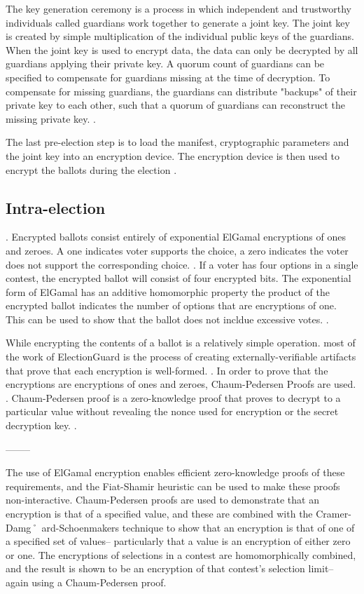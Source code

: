 The key generation ceremony is a process in which independent and trustworthy individuals called guardians work together to generate a joint key. The joint key is created by simple multiplication of the individual public keys of the guardians. When the joint key is used to encrypt data, the data can only be decrypted by all guardians applying their private key. A quorum count of guardians can be specified to compensate for guardians missing at the time of decryption. To compensate for missing guardians, the guardians can distribute "backups" of their private key to each other, such that a quorum of guardians can reconstruct the missing private key. \cite[8]{eg-paper} \cite{eg-docs}.

The last pre-election step is to load the manifest, cryptographic parameters and the joint key into an encryption device. The encryption device is then used to encrypt the ballots during the election \cite[8]{eg-paper}.

\subsection{Intra-election}.
Encrypted ballots consist entirely of exponential ElGamal encryptions of ones and zeroes. A one indicates voter supports the choice, a zero indicates the voter does not support the corresponding choice. \cite[11]{eg-paper} \cite[12]{eg-spec}. If a voter has four options in a single contest, the encrypted ballot will consist of four encrypted bits. The exponential form of ElGamal has an additive homomorphic property the product of the encrypted ballot indicates the number of options that are encryptions of one. This can be used to show that the ballot does not incldue excessive votes. \cite[5]{eg-spec}.

While encrypting the contents of a ballot is a relatively simple operation. most of the work of ElectionGuard is the process of creating externally-verifiable artifacts that prove that each encryption is well-formed. \cite[3]{eg-spec}. In order to prove that the encryptions are encryptions of ones and zeroes, Chaum-Pedersen Proofs are used. \cite[11]{eg-paper}. Chaum-Pedersen proof is a zero-knowledge proof that proves to decrypt to a particular value without revealing the nonce used for encryption or the secret decryption key. \cite[6]{eg-spec}.

--------

The use of ElGamal encryption enables efficient zero-knowledge proofs of these requirements, and
 the Fiat-Shamir heuristic can be used to make these proofs non-interactive. Chaum-Pedersen proofs
 are used to demonstrate that an encryption is that of a specified value, and these are combined
 with the Cramer-Damg˚ ard-Schoenmakers technique to show that an encryption is that of one of
 a specified set of values– particularly that a value is an encryption of either zero or one. The
 encryptions of selections in a contest are homomorphically combined, and the result is shown to be
 an encryption of that contest’s selection limit– again using a Chaum-Pedersen proof. \cite[13]{eg-spec}

